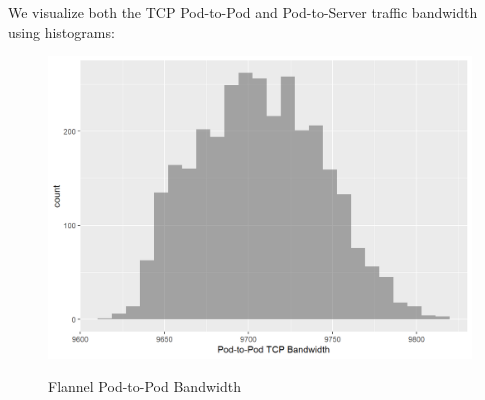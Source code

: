 We visualize both the TCP Pod-to-Pod and Pod-to-Server traffic bandwidth using histograms:

\filbreak

\begin{Shaded}
\begin{Highlighting}[]
\NormalTok{(}\SpecialCharTok{\textasciitilde{}} 
\end{Highlighting}
\end{Shaded}

\begin{figure}[H]
\centering
\caption {Flannel Pod-to-Pod Bandwidth}
\includegraphics[width=\linewidth]{images/unnamed-chunk-8-1.png}
\label{fig:flannel-8-1}
\end{figure}

\filbreak

\begin{Shaded}
\begin{Highlighting}[]
\NormalTok{(}\SpecialCharTok{\textasciitilde{}} 
\end{Highlighting}
\end{Shaded}

